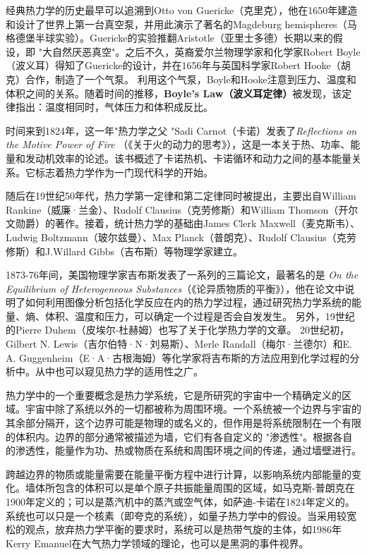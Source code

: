经典热力学的历史最早可以追溯到Otto von Guericke（克里克），他在1650年建造和设计了世界上第一台真空泵，并用此演示了著名的Magdeburg hemispheres（马格德堡半球实验）。Guericke的实验推翻Aristotle（亚里士多德）长期以来的假设，即 "大自然厌恶真空"。之后不久，英裔爱尔兰物理学家和化学家Robert Boyle（波义耳）得知了Guericke的设计，并在1656年与英国科学家Robert Hooke（胡克）合作，制造了一个气泵。\cite{partington1989short} 利用这个气泵，Boyle和Hooke注意到压力、温度和体积之间的关系。随着时间的推移，\textbf{Boyle's Law（波义耳定律）}被发现，该定律指出：温度相同时，气体压力和体积成反比。

时间来到1824年，这一年"热力学之父 "Sadi Carnot（卡诺）发表了\textit{Reflections on the Motive Power of Fire} （《关于火的动力的思考》），这是一本关于热、功率、能量和发动机效率的论述。该书概述了卡诺热机、卡诺循环和动力之间的基本能量关系。它标志着热力学作为一门现代科学的开始。\cite{perrot1998z}

随后在19世纪50年代，热力学第一定律和第二定律同时被提出，主要出自William Rankine（威廉·兰金）、Rudolf Clausius（克劳修斯）和William Thomson（开尔文勋爵）的著作。接着，统计热力学的基础由James Clerk Maxwell（麦克斯韦）、Ludwig Boltzmann（玻尔兹曼）、Max Planck（普朗克）、Rudolf Clausius（克劳修斯）和J.Willard Gibbs（吉布斯）等物理学家建立。

1873-76年间，美国物理学家吉布斯发表了一系列的三篇论文，最著名的是\textit{ On the Equilibrium of Heterogeneous Substances}（《论异质物质的平衡》）\cite{connecticut1866transactions}，他在论文中说明了如何利用图像分析包括化学反应在内的热力学过程，通过研究热力学系统的能量、熵、体积、温度和压力，可以确定一个过程是否会自发发生。\cite{sugi1993scientific} 另外，19世纪的Pierre Duhem（皮埃尔-杜赫姆）也写了关于化学热力学的文章\cite{duhem1886potentiel}。 20世纪初，Gilbert N. Lewis（吉尔伯特·N·刘易斯）、Merle Randall（梅尔·兰德尔）\cite{lewis1923thermodynamics}和E. A. Guggenheim（E·A·古根海姆）\cite{guggenheim2002modern,guggenheim1967advanced}等化学家将吉布斯的方法应用到化学过程的分析中。从中也可以窥见热力学的适用性之广。


热力学中的一个重要概念是热力学系统，它是所研究的宇宙中一个精确定义的区域。宇宙中除了系统以外的一切都被称为周围环境。一个系统被一个边界与宇宙的其余部分隔开，这个边界可能是物理的或名义的，但作用是将系统限制在一个有限的体积内。边界的部分通常被描述为墙，它们有各自定义的 "渗透性"。根据各自的渗透性，能量作为功、热或物质在系统和周围环境之间的传递，通过墙壁进行。

跨越边界的物质或能量需要在能量平衡方程中进行计算，以影响系统内部能量的变化。墙体所包含的体积可以是单个原子共振能量周围的区域，如马克斯-普朗克在1900年定义的；可以是蒸汽机中的蒸汽或空气体，如萨迪-卡诺在1824年定义的。系统也可以只是一个核素（即夸克的系统），如量子热力学中的假设。当采用较宽松的观点，放弃热力学平衡的要求时，系统可以是热带气旋的主体，如1986年Kerry Emanuel在大气热力学领域的理论，也可以是黑洞的事件视界。

